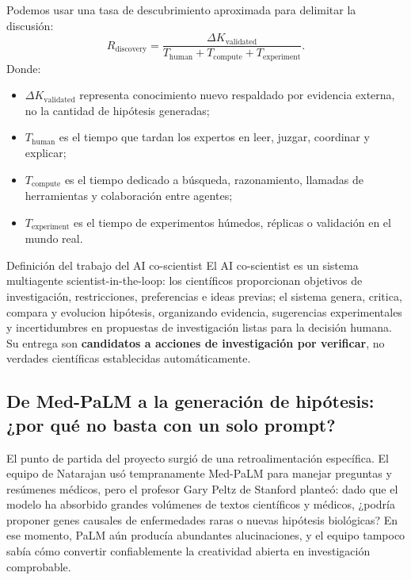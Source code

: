 Podemos usar una tasa de descubrimiento aproximada para delimitar la discusión:
$$
R_{\text{discovery}}
=\frac{\Delta K_{\text{validated}}}
{T_{\text{human}}+T_{\text{compute}}+T_{\text{experiment}}}.
$$
Donde:
\begin{itemize}
  \item $\Delta K_{\text{validated}}$ representa conocimiento nuevo respaldado por evidencia externa, no la cantidad de hipótesis generadas;
  \item $T_{\text{human}}$ es el tiempo que tardan los expertos en leer, juzgar, coordinar y explicar;
  \item $T_{\text{compute}}$ es el tiempo dedicado a búsqueda, razonamiento, llamadas de herramientas y colaboración entre agentes;
  \item $T_{\text{experiment}}$ es el tiempo de experimentos húmedos, réplicas o validación en el mundo real.
\end{itemize}

\begin{importantbox}{Definición del trabajo del AI co-scientist}
El AI co-scientist es un sistema multiagente scientist-in-the-loop: los científicos proporcionan objetivos de investigación, restricciones, preferencias e ideas previas; el sistema genera, critica, compara y evolucion hipótesis, organizando evidencia, sugerencias experimentales y incertidumbres en propuestas de investigación listas para la decisión humana. Su entrega son \textbf{candidatos a acciones de investigación por verificar}, no verdades científicas establecidas automáticamente.
\end{importantbox}


\subsection{De Med-PaLM a la generación de hipótesis: ¿por qué no basta con un solo prompt?}

El punto de partida del proyecto surgió de una retroalimentación específica. El equipo de Natarajan usó tempranamente Med-PaLM para manejar preguntas y resúmenes médicos, pero el profesor Gary Peltz de Stanford planteó: dado que el modelo ha absorbido grandes volúmenes de textos científicos y médicos, ¿podría proponer genes causales de enfermedades raras o nuevas hipótesis biológicas? En ese momento, PaLM aún producía abundantes alucinaciones, y el equipo tampoco sabía cómo convertir confiablemente la creatividad abierta en investigación comprobable.

